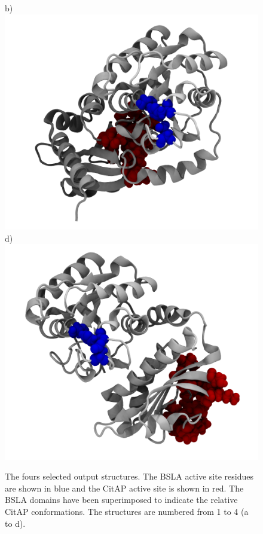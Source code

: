 \documentclass[english, a4paper, 12pt, titlepage, draft]{article}
\begin{document}
\begin{figure}
\begin{minipage}[]{0.45\linewidth}
        \centering
        b)
        \includegraphics[width=\textwidth]{figures/Complex_structures/structure2.png}  
        d)
        \includegraphics[width=\textwidth]{figures/Complex_structures/structure4.png}  
    \end{minipage}
    \caption{The fours selected output structures.
        The BSLA active site residues are shown in blue and the CitAP active site is shown in red.
        The BSLA domains have been superimposed to indicate the relative CitAP conformations.
    The structures are numbered from 1 to 4 (a to d).}
\label{fig:GMIN_output}
\end{figure}       
\end{document}
